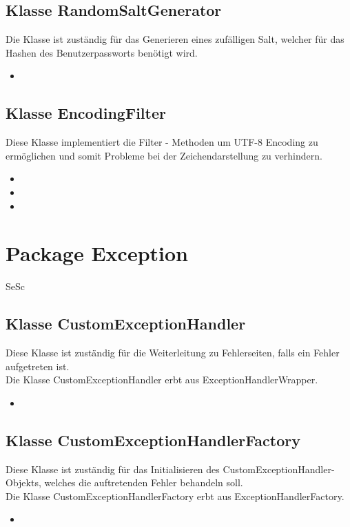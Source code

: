 \documentclass[a4paper]{scrreprt}
\begin{document}
	\subsection{Klasse RandomSaltGenerator}
	Die Klasse ist zuständig für das Generieren eines zufälligen Salt, welcher für das Hashen des Benutzerpassworts benötigt wird.
	\begin{itemize}
		\item {}
	\end{itemize} 
	
	\subsection{Klasse EncodingFilter}
	Diese Klasse implementiert die Filter - Methoden um UTF-8 Encoding zu
	ermöglichen und somit Probleme bei der Zeichendarstellung zu verhindern.
	\begin{itemize}
		\item \override
		\item \override
		\item \override
	\end{itemize}
	
	\section{Package Exception}
	\begin{tiny}
		SeSc
	\end{tiny}
	\subsection{Klasse CustomExceptionHandler}
	Diese Klasse ist zuständig für die Weiterleitung zu Fehlerseiten, falls ein Fehler aufgetreten
	ist. \\
	Die Klasse CustomExceptionHandler erbt aus ExceptionHandlerWrapper.
	\begin{itemize}
		\item \override
	\end{itemize}
	
	\subsection{Klasse CustomExceptionHandlerFactory}
	Diese Klasse ist zuständig für das  Initialisieren des CustomExceptionHandler-Objekts, welches die auftretenden Fehler behandeln soll.\\
	Die Klasse CustomExceptionHandlerFactory erbt aus ExceptionHandlerFactory.
	\begin{itemize}
		\item \override
	\end{itemize}
	
\end{document}
